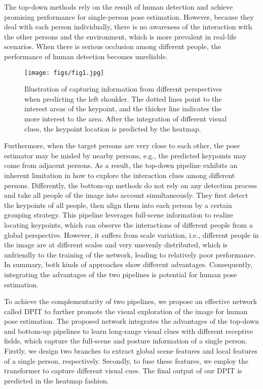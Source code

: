 \documentclass[runningheads]{llncs}
\begin{document}
The top-down methods rely on the result of human detection and achieve promising performance for single-person pose estimation. However, because they deal with each person individually, there is no awareness of the interaction with the other persons and the environment, which is more prevalent in real-life scenarios. When there is serious occlusion among different people, the performance of human detection becomes unreliable.
\begin{figure*}
  \centerline{\texttt{[image: figs/fig1.jpg]}}
  \caption{Illustration of capturing information from different perspectives when predicting the left shoulder. The dotted lines point to the interest areas of the keypoint, and the thicker line indicates the more interest to the area. After the integration of different visual clues, the keypoint location is predicted by the heatmap.}
  \label{figs_1}
\end{figure*}
Furthermore, when the target persons are very close to each other, the pose estimator may be misled by nearby persons, e.g., the predicted keypoints may come from adjacent persons. As a result, the top-down pipeline exhibits an inherent limitation in how to explore the interaction clues among different persons. Differently, the bottom-up methods do not rely on any detection process and
take all people of the image into account simultaneously. They first detect the keypoints of all people, then align them into each person by a certain grouping strategy. This pipeline leverages full-scene information to realize locating keypoints, which can observe the interactions of different people from a global perspective. However, it suffers from scale variation, i.e., different people in the image are at different scales and very unevenly distributed, which is unfriendly to the training of the network, leading to relatively poor performance. In summary, both kinds of approaches 
show different advantages. Consequently, integrating the advantages of the two pipelines is potential for human pose estimation.


To achieve the complementarity of two pipelines, we propose an effective network called DPIT to further promote the visual exploration of the image for human pose estimation. The proposed network integrates the advantages of the top-down and bottom-up pipelines to learn long-range visual clues with different receptive fields, which capture the full-scene and posture information of a single person. Firstly, we design two branches to extract global scene features and local features of a single person, respectively. Secondly, to fuse these features, we employ the transformer to capture different visual cues. The final output of our DPIT is predicted in the heatmap fashion.
\end{document}
